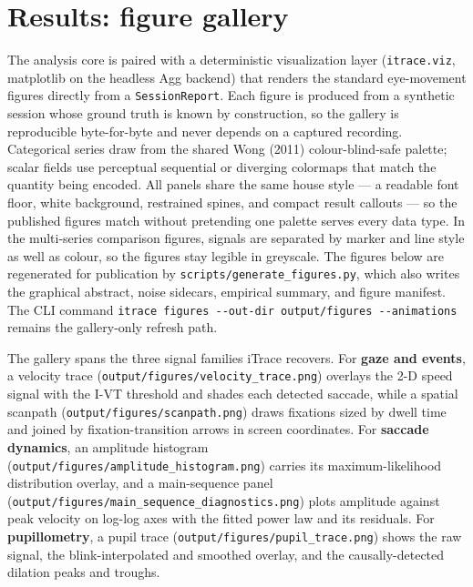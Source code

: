\documentclass[
]{article}
\begin{document}
\section{Results: figure gallery}\label{sec:gallery}

The analysis core is paired with a deterministic visualization layer
(\texttt{itrace.viz}, matplotlib on the headless Agg backend) that
renders the standard eye-movement figures directly from a
\texttt{SessionReport}. Each figure is produced from a synthetic session
whose ground truth is known by construction, so the gallery is
reproducible byte-for-byte and never depends on a captured recording.
Categorical series draw from the shared Wong (2011) colour-blind-safe
palette; scalar fields use perceptual sequential or diverging colormaps
that match the quantity being encoded. All panels share the same house
style --- a readable font floor, white background, restrained spines,
and compact result callouts --- so the published figures match without
pretending one palette serves every data type. In the multi-series
comparison figures, signals are separated by marker and line style as
well as colour, so the figures stay legible in greyscale. The figures
below are regenerated for publication by
\texttt{scripts/generate\_figures.py}, which also writes the graphical
abstract, noise sidecars, empirical summary, and figure manifest. The
CLI command
\texttt{itrace\ figures\ -\/-out-dir\ output/figures\ -\/-animations}
remains the gallery-only refresh path.

The gallery spans the three signal families iTrace recovers. For
\textbf{gaze and events}, a velocity trace
(\texttt{output/figures/velocity\_trace.png}) overlays the 2-D speed
signal with the I-VT threshold and shades each detected saccade, while a
spatial scanpath (\texttt{output/figures/scanpath.png}) draws fixations
sized by dwell time and joined by fixation-transition arrows in screen
coordinates. For \textbf{saccade dynamics}, an amplitude histogram
(\texttt{output/figures/amplitude\_histogram.png}) carries its
maximum-likelihood distribution overlay, and a main-sequence panel
(\texttt{output/figures/main\_sequence\_diagnostics.png}) plots
amplitude against peak velocity on log-log axes with the fitted power
law and its residuals. For \textbf{pupillometry}, a pupil trace
(\texttt{output/figures/pupil\_trace.png}) shows the raw signal, the
blink-interpolated and smoothed overlay, and the causally-detected
dilation peaks and troughs.
\end{document}
